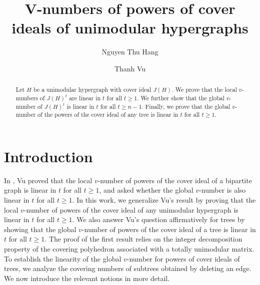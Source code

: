 \documentclass[12pt,amscd]{amsart}
\theoremstyle{definition}
\numberwithin{equation}{section}
\begin{document}
\title{V-numbers of powers of cover ideals of unimodular hypergraphs}


\author[N.T. Hang]{Nguyen Thu Hang}
\address{Thai Nguyen University of Sciences, Phan Dinh phung Ward, Thai Nguyen, Vietnam}

\author{Thanh Vu}
\address{Institute of Mathematics, VAST, 18 Hoang Quoc Viet, Hanoi, Vietnam}



\date{}

 
\commby{}

\begin{abstract} Let $H$ be a unimodular hypergraph with cover ideal $J(H)$. We prove that the local $v$-numbers of $J(H)^t$ are linear in $t$ for all $t\ge1$. We further show that the global $v$-number of $J(H)^t$ is linear in $t$ for all $t\ge n-1$. Finally, we prove that the global $v$-number of the powers of the cover ideal of any tree is linear in $t$ for all $t\ge1$.
\end{abstract}

\maketitle
\section{Introduction}
\label{sect_intro}
In \cite{V}, Vu proved that the local $v$-number of powers of the cover ideal of a bipartite graph is linear in $t$ for all $t\ge1$, and asked whether the global $v$-number is also linear in $t$ for all $t\ge1$. In this work, we generalize Vu's result by proving that the local $v$-number of powers of the cover ideal of any unimodular hypergraph is linear in $t$ for all $t\ge1$. We also answer Vu's question affirmatively for trees by showing that the global $v$-number of powers of the cover ideal of a tree is linear in $t$ for all $t\ge1$. The proof of the first result relies on the integer decomposition property of the covering polyhedron associated with a totally unimodular matrix. To establish the linearity of the global $v$-number for powers of cover ideals of trees, we analyze the covering numbers of subtrees obtained by deleting an edge. We now introduce the relevant notions in more detail.
\end{document}
